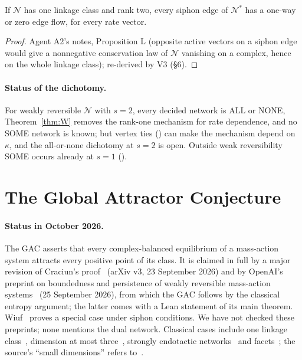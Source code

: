 \documentclass[11pt,a4paper]{report}
\newcommand{\Net}{\mathcal{N}}
\newcommand{\Nd}{\mathcal{N}^{*}}
\begin{document}
\begin{proposition}[agent A2]\label{prop:L}
If \(\Net\) has one linkage class and rank two, every siphon edge of \(\Nd\) has a one-way or zero edge flow, for every rate
vector.
\end{proposition}
\begin{proof}
Agent A2's notes, Proposition L (opposite active vectors on a siphon edge would give a nonnegative conservation law of
\(\Net\) vanishing on a complex, hence on the whole linkage class); re-derived by V3 (§6).
\end{proof}

\paragraph{Status of the dichotomy.} For weakly reversible \(\Net\) with \(s=2\), every decided network is ALL or NONE,
Theorem~\ref{thm:W} removes the rank-one mechanism for rate dependence, and no SOME network is known; but vertex ties
() can make the mechanism depend on \(\kappa\), and the all-or-none dichotomy at \(s=2\) is open. Outside
weak reversibility SOME occurs already at \(s=1\) ().

\section{The Global Attractor Conjecture}\label{sec:gac}

\paragraph{Status in October 2026.} The GAC asserts that every complex-balanced equilibrium of a mass-action system attracts
every positive point of its class. It is claimed in full by a major revision of Craciun's
proof~\autocite{Craciun2015GAC} (arXiv v3, 23 September 2026) and by OpenAI's preprint on boundedness and persistence of
weakly reversible mass-action systems~\autocite{OpenAI2026persistence} (25 September 2026), from which the GAC follows
by the classical entropy argument; the latter comes with a Lean statement of its main theorem. Wiuf~\autocite{Wiuf2026}
proves a special case under siphon conditions. We have not checked these preprints; none mentions the dual network.
Classical cases include one linkage class~\autocite{Anderson2011}, dimension at most three~\autocite{Pantea2012}, strongly
endotactic networks~\autocite{GopalkrishnanMillerShiu2014} and facets~\autocite{AndersonShiu2010}; the source's ``small
dimensions'' refers to~\autocite{CDSS2009}.
\end{document}
